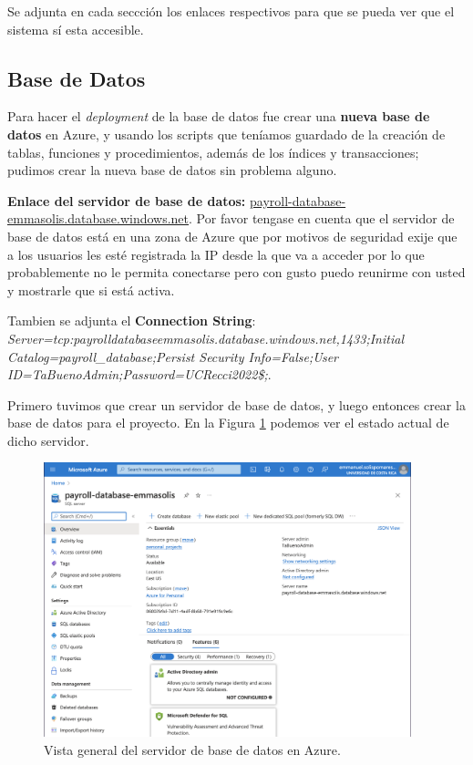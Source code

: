 \documentclass{article}
\begin{document}
Se adjunta en cada seccción los enlaces respectivos para que se pueda ver que el sistema
sí esta accesible.

\subsection{Base de Datos}
Para hacer el \textit{deployment} de la base de datos fue crear una \textbf{nueva base de datos}
en Azure, y usando los scripts que teníamos guardado de la creación de tablas, funciones
y procedimientos, además de los índices y transacciones; pudimos crear la nueva base de datos
sin problema alguno.

\textbf{Enlace del servidor de base de datos:} \href{payroll-database-emmasolis.database.windows.net}{payroll-database-emmasolis.database.windows.net}. Por
favor tengase en cuenta que el servidor de base de datos está en una zona de Azure que por motivos de seguridad
exije que a los usuarios les esté registrada la IP desde la que va a acceder por lo que probablemente
no le permita conectarse pero con gusto puedo reunirme con usted y mostrarle que si está activa.

Tambien se adjunta el \textbf{Connection String}:
\textit{Server=tcp:payroll\-database\-emmasolis.database.windows.net,1433;Initial Catalog=payroll\_database;Persist Security Info=False;User ID=TaBuenoAdmin;Password=UCRecci2022\$;}.

Primero tuvimos que crear un servidor de base de datos, y luego entonces crear la base
de datos para el proyecto. En la Figura \ref{fig:database_server} podemos ver el estado
actual de dicho servidor.

\begin{figure}[h]
 \centering
 \includegraphics[width=0.95\textwidth]{database_server.png}
 \caption{Vista general del servidor de base de datos en Azure.}
 \label{fig:database_server}
\end{figure}
\end{document}
